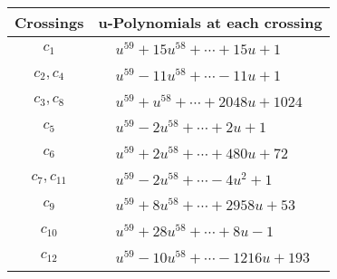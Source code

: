 \documentclass[1p]{elsarticle_modified}
\theoremstyle{definition}
\begin{document}
\begin{tabular}{m{50pt}|m{274pt}}
Crossings & \hspace{64pt}u-Polynomials at each crossing \\
\hline $$\begin{aligned}c_{1}\end{aligned}$$&$\begin{aligned}
&u^{59}+15 u^{58}+\cdots+15 u+1
\end{aligned}$\\
\hline $$\begin{aligned}c_{2},c_{4}\end{aligned}$$&$\begin{aligned}
&u^{59}-11 u^{58}+\cdots-11 u+1
\end{aligned}$\\
\hline $$\begin{aligned}c_{3},c_{8}\end{aligned}$$&$\begin{aligned}
&u^{59}+u^{58}+\cdots+2048 u+1024
\end{aligned}$\\
\hline $$\begin{aligned}c_{5}\end{aligned}$$&$\begin{aligned}
&u^{59}-2 u^{58}+\cdots+2 u+1
\end{aligned}$\\
\hline $$\begin{aligned}c_{6}\end{aligned}$$&$\begin{aligned}
&u^{59}+2 u^{58}+\cdots+480 u+72
\end{aligned}$\\
\hline $$\begin{aligned}c_{7},c_{11}\end{aligned}$$&$\begin{aligned}
&u^{59}-2 u^{58}+\cdots-4 u^2+1
\end{aligned}$\\
\hline $$\begin{aligned}c_{9}\end{aligned}$$&$\begin{aligned}
&u^{59}+8 u^{58}+\cdots+2958 u+53
\end{aligned}$\\
\hline $$\begin{aligned}c_{10}\end{aligned}$$&$\begin{aligned}
&u^{59}+28 u^{58}+\cdots+8 u-1
\end{aligned}$\\
\hline $$\begin{aligned}c_{12}\end{aligned}$$&$\begin{aligned}
&u^{59}-10 u^{58}+\cdots-1216 u+193
\end{aligned}$\\
\hline
\end{tabular}\\~\\
\end{document}
